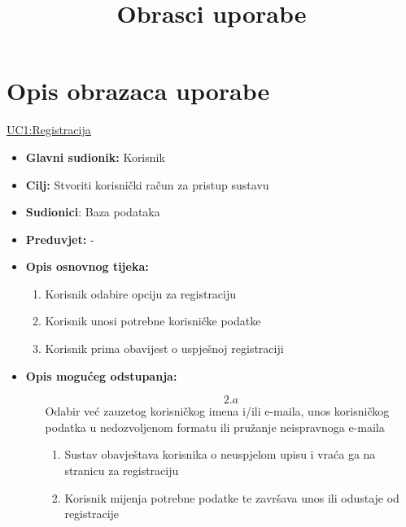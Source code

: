 \documentclass{article} %
\title{Obrasci uporabe}
\date{}
\begin{document}

\maketitle
\newpage

\section{Opis obrazaca uporabe}
\underline{UC1:Registracija}

\begin{itemize}
	\item \textbf{Glavni sudionik:} Korisnik
	
	
	\item \textbf{Cilj:} Stvoriti korisnički račun za pristup sustavu 
	
	
	\item \textbf{Sudionici}: Baza podataka
	
	
	\item \textbf{Preduvjet:} -
	
	
	\item \textbf{Opis osnovnog tijeka:} 
	\begin{enumerate}
		\item Korisnik odabire opciju za registraciju
		
		
		\item Korisnik unosi potrebne korisničke podatke
		
		
		\item Korisnik prima obavijest o uspješnoj registraciji
		
	\end{enumerate}
		\item \textbf{Opis mogućeg odstupanja:}

		\begin{enumerate}
		\item[$$2.a$$] Odabir već zauzetog korisničkog imena i/ili e-maila, unos korisničkog podatka u nedozvoljenom formatu ili pružanje neispravnoga e-maila
		
		\begin{enumerate}[label=\arabic*.]
		\item Sustav obavještava korisnika o neuspjelom upisu i vraća ga na stranicu za registraciju
		
		
		\item Korisnik mijenja potrebne podatke te završava unos ili odustaje od registracije
		\end{enumerate}
		\end{enumerate}
\end{itemize}
 
\end{document}
